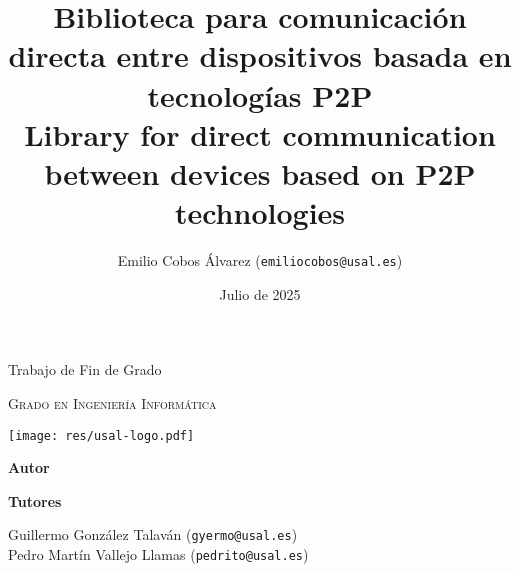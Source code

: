\documentclass[12pt,a4paper]{report}
\title{
  \textbf{Biblioteca para comunicación directa entre dispositivos basada en tecnologías P2P} \\
  \vspace{0.5em}
  \small \textbf{Library for direct communication between devices based on P2P technologies}
}
\author{
  Emilio Cobos Álvarez (\texttt{emiliocobos@usal.es})
}
\date{Julio de 2025}
\begin{document}
 

\begin{titlepage}
\begin{center}
  {\Large \thetitle}

  \vspace{3em}

  {\large Trabajo de Fin de Grado}

  \vspace{0.5em}

  \textsc{Grado en Ingeniería Informática}

  \vspace{2em}

  \texttt{[image: res/usal-logo.pdf]}

  \vspace{2em}

  \thedate

  \vspace{2em}

  {\large \textbf{Autor}}

  \vspace{0.5em}

  \theauthor

  \vspace{2em}

  {\large \textbf{Tutores}}

  \vspace{0.5em}

  Guillermo González Talaván (\texttt{gyermo@usal.es}) \\ Pedro Martín Vallejo Llamas (\texttt{pedrito@usal.es})
\end{center}
\end{titlepage}



\clearpage



\clearpage


\tableofcontents


\end{document}
